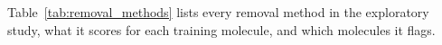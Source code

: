 %
%
%
%
Table~\ref{tab:removal_methods} lists every removal method in the exploratory study, what it scores for each training molecule, and which molecules it flags.

